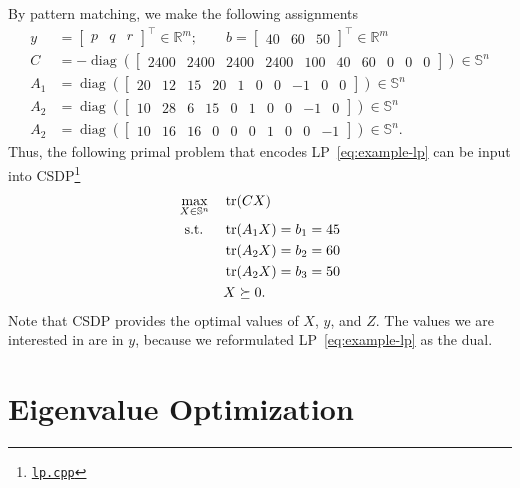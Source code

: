 \documentclass[a4paper]{article}
\DeclareMathOperator{\diag}{diag}
\begin{document}
By pattern matching, we make the following assignments
\begin{align*}
y &= \begin{bmatrix}p & q & r\end{bmatrix}^\top\in\mathbb{R}^m; \qquad b = \begin{bmatrix}40 & 60 & 50\end{bmatrix}^\top\in\mathbb{R}^m \\
C &= -\diag(\begin{bmatrix}2400 & 2400 & 2400 & 2400 & 100 & 40 & 60 & 0 & 0 & 0\end{bmatrix})\in\mathbb{S}^n \\
A_1 &= \diag(\begin{bmatrix}20 & 12 & 15 & 20 & 1 & 0 & 0 & -1 & 0 & 0\end{bmatrix})\in\mathbb{S}^n \\
A_2 &= \diag(\begin{bmatrix}10 & 28 & 6 & 15 & 0 & 1 & 0 & 0 & -1 & 0\end{bmatrix})\in\mathbb{S}^n \\
A_2 &= \diag(\begin{bmatrix}10 & 16 & 16 & 0 & 0 & 0 & 1 & 0 & 0 & -1\end{bmatrix})\in\mathbb{S}^n.
\end{align*}
Thus, the following primal problem that encodes LP~\eqref{eq:example-lp} can be input into CSDP\footnote{\href{https://github.com/plusk01/tests/blob/master/csdp/src/lp.cpp}{\texttt{lp.cpp}}}
\begin{equation}
\begin{aligned}
\max_{X\in\mathbb{S}^n}                 \quad & \tr(CX) \\
\textrm{s.t. } \quad & \tr(A_1X) = b_1 = 45 \\
                     & \tr(A_2X) = b_2 = 60 \\
                     & \tr(A_2X) = b_3 = 50 \\
                     & X \succeq 0.
\end{aligned}
\end{equation}
Note that CSDP provides the optimal values of $X$, $y$, and $Z$.
The values we are interested in are in $y$, because we reformulated LP~\eqref{eq:example-lp} as the dual.

\section*{Eigenvalue Optimization}


\end{document}
